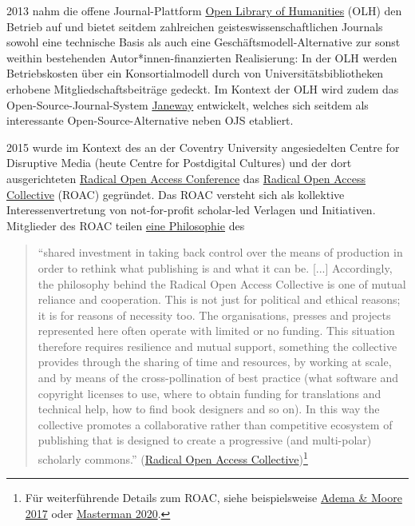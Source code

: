 \documentclass[a4paper,
fontsize=11pt,
oneside,
numbers=noperiodatend,
parskip=half-,
bibliography=totoc,
final
]{scrartcl}
\begin{document}
2013 nahm die offene Journal-Plattform
\href{https://www.openlibhums.org/}{Open Library of Humanities} (OLH)
den Betrieb auf und bietet seitdem zahlreichen geisteswissenschaftlichen
Journals sowohl eine technische Basis als auch eine
Geschäftsmodell-Alternative zur sonst weithin bestehenden
Autor*innen-finanzierten Realisierung: In der OLH werden Betriebskosten
über ein Konsortialmodell durch von Universitätsbibliotheken erhobene
Mitgliedschaftsbeiträge gedeckt. Im Kontext der OLH wird zudem das
Open-Source-Journal-System
\href{http://doi.org/10.1629/uksg.396}{Janeway} entwickelt, welches sich
seitdem als interessante Open-Source-Alternative neben OJS etabliert.

2015 wurde im Kontext des an der Coventry University angesiedelten
Centre for Disruptive Media (heute Centre for Postdigital Cultures) und
der dort ausgerichteten
\href{https://disruptivemedia.org.uk/portfolio/radical-open-access-conference/}{Radical
Open Access Conference} das
\href{https://radicaloa.disruptivemedia.org.uk/}{Radical Open Access
Collective} (ROAC) gegründet. Das ROAC versteht sich als kollektive
Interessenvertretung von not-for-profit scholar-led Verlagen und
Initiativen. Mitglieder des ROAC teilen
\href{https://radicaloa.disruptivemedia.org.uk/philosophy/}{eine
Philosophie} des

\begin{quote}
\enquote{shared investment in taking back control over the means of
production in order to rethink what publishing is and what it can be.
{[}...{]} Accordingly, the philosophy behind the Radical Open Access
Collective is one of mutual reliance and cooperation. This is not just
for political and ethical reasons; it is for reasons of necessity too.
The organisations, presses and projects represented here often operate
with limited or no funding. This situation therefore requires resilience
and mutual support, something the collective provides through the
sharing of time and resources, by working at scale, and by means of the
cross-pollination of best practice (what software and copyright licenses
to use, where to obtain funding for translations and technical help, how
to find book designers and so on). In this way the collective promotes a
collaborative rather than competitive ecosystem of publishing that is
designed to create a progressive (and multi-polar) scholarly commons.}
(\href{https://radicaloa.disruptivemedia.org.uk/philosophy/}{Radical
Open Access Collective})\footnote{Für weiterführende Details zum ROAC,
  siehe beispielsweise \href{http://doi.org/10.1629/uksg.399}{Adema \&
  Moore 2017} oder \href{https://doi.org/10.17613/t5n3-x550}{Masterman
  2020}.}
\end{quote}
\end{document}
